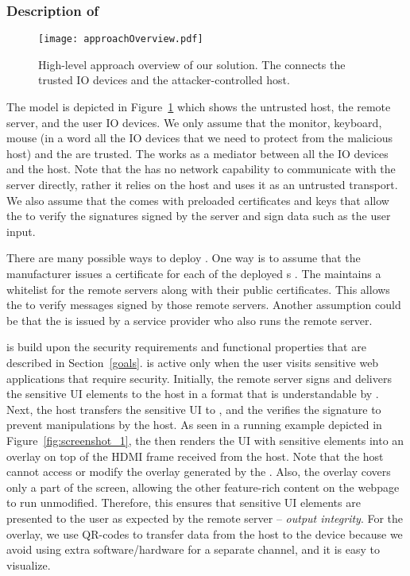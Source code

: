 \subsubsection*{Description of \name}

\begin{figure}[t]
	\centering
	\texttt{[image: approachOverview.pdf]}
	\caption{High-level approach overview of our solution.  The \device connects the trusted IO devices and the attacker-controlled host.}
	\label{fig:approachOverview}
\end{figure}

The model is depicted in Figure~\ref{fig:approachOverview} which shows the untrusted host, the remote server, and the user IO devices. We only assume that the monitor, keyboard, mouse (in a word all the IO devices that we need to protect from the malicious host) and the \device are trusted. The \device works as a mediator between all the IO devices and the host. Note that the \device has no network capability to communicate with the server directly, rather it relies on the host and uses it as an untrusted transport. We also assume that the \device comes with preloaded certificates and keys that allow the \device to verify the signatures signed by the server and sign data such as the user input.

There are many possible ways to deploy \name. One way is to assume that the \device manufacturer issues a certificate for each of the deployed \device{}s . The \device maintains a whitelist for the remote servers along with their public certificates. This allows the \device to verify messages signed by those remote servers. Another assumption could be that the \device is issued by a service provider who also runs the remote server. 

\name is build upon the security requirements and functional properties that are described in Section~\ref{goals}. 
\device is active only when the user visits sensitive web applications that require \name security.
Initially, the remote server signs and delivers the sensitive UI elements to the host in a format that is understandable by \device. Next, the host transfers the sensitive UI to \device, and the \device verifies the signature to prevent manipulations by the host. As seen in a running example depicted in Figure~\ref{fig:screenshot_1}, the \device then renders the UI with sensitive elements into an overlay on top of the HDMI frame received from the host. Note that the host cannot access or modify the overlay generated by the \device. Also, the overlay covers only a part of the screen, allowing the other feature-rich content on the webpage to run unmodified. Therefore, this ensures that sensitive UI elements are presented to the user as expected by the remote server -- \emph{output integrity}. For the overlay, we use QR-codes to transfer data from the host to the device because we avoid using extra software/hardware for a separate channel, and it is easy to visualize.

